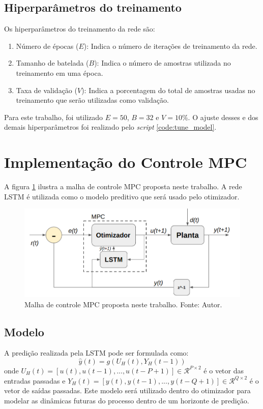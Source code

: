 \subsection{Hiperparâmetros do treinamento}
Os hiperparâmetros do treinamento da rede são:
\begin{enumerate}
    \item Número de épocas ($E$): Indica o número de iterações de treinamento da rede.
    \item Tamanho de batelada ($B$): Indica o número de amostras utilizada no treinamento em uma época.
    \item Taxa de validação ($V$): Indica a porcentagem do total de amostras usadas no treinamento que serão utilizadas como validação. 
\end{enumerate}
Para este trabalho, foi utilizado $E=50$, $B=32$ e $V=10\%$. O ajuste desses e dos demais hiperparâmetros foi realizado pelo \textit{script} \ref{code:tune_model}.

\section{Implementação do Controle MPC}
A figura \ref{fig:mpc_loop} ilustra a malha de controle MPC proposta neste trabalho. A rede LSTM é utilizada como o modelo preditivo que será usado pelo otimizador.

\newpage
\begin{figure}[hbt!]
    \centering
    \includegraphics[width=0.8\linewidth]{Imagens/chap03/mpc_loop.png}
    \caption{Malha de controle MPC proposta neste trabalho. Fonte: Autor.}
    \label{fig:mpc_loop}
\end{figure}

\label{sec:mpc_imp}
\subsection{Modelo}
A predição realizada pela LSTM pode ser formulada como:
\begin{equation}
    \hat{y}(t) = g(U_H(t), Y_H(t-1))
\end{equation}
onde $U_H(t)= [u(t), u(t-1), ..., u(t-P+1)] \in \mathcal{R}^{P\times 2}$ é o vetor das entradas passadas e $Y_H(t)=[y(t), y(t-1), ... , y(t-Q+1)] \in \mathcal{R}^{Q \times 2}$ é o vetor de saídas passadas. Este modelo será utilizado dentro do otimizador para modelar as dinâmicas futuras do processo dentro de um horizonte de predição.

